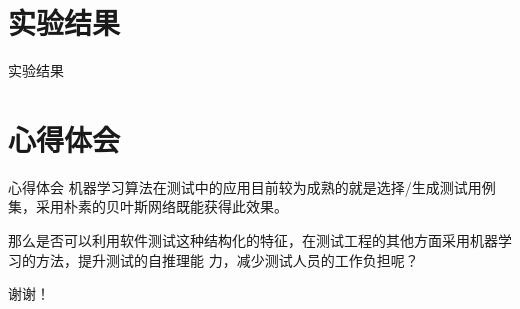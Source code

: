 \documentclass{beamer}
\begin{document}
    \section{实验结果}
    
    \begin{frame}{实验结果}
    \end{frame}

    \section{心得体会}
    \begin{frame}{心得体会}
        \hspace{2em}机器学习算法在测试中的应用目前较为成熟的就是选择/生成测试用例集，采用朴素的贝叶斯网络既能获得此效果。

        \hspace{2em}那么是否可以利用软件测试这种结构化的特征，在测试工程的其他方面采用机器学习的方法，提升测试的自推理能
        力，减少测试人员的工作负担呢？
    \end{frame}

    \begin{frame}
        \centering
        \Huge{谢谢！}
    \end{frame}
\end{document}
